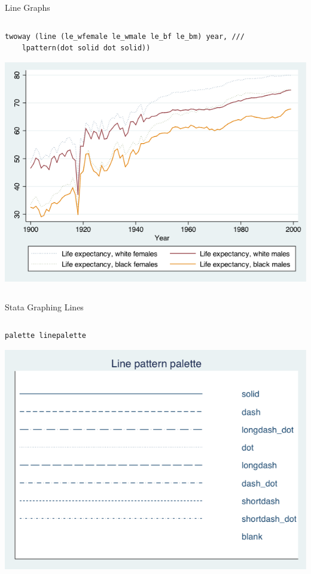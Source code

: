 \documentclass[table,smaller]{beamer}
\begin{document}
\begin{frame}[fragile,label=sec-4-3]{Line Graphs}
 \vspace{-.5em} \begin{columns}  \begin{block}{}
\begin{verbatim}
twoway (line (le_wfemale le_wmale le_bf le_bm) year, ///
    lpattern(dot solid dot solid))
\end{verbatim}

\includegraphics[width=.9\linewidth]{./images/linegraph2.png}

\end{block} \end{columns}
\end{frame}

\begin{frame}[fragile,label=sec-4-4]{Stata Graphing Lines}
 \vspace{-.5em} \begin{columns}  \begin{block}{}
\begin{verbatim}
palette linepalette
\end{verbatim}

\includegraphics[width=.9\linewidth]{./images/linepalette.png}

\end{block} \end{columns}
\end{frame}
\end{document}
